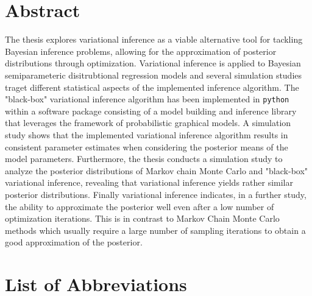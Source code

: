 \clearpage
{}


\section*{Abstract}

The thesis explores variational inference as a viable alternative tool for 
tackling Bayesian inference problems, allowing for the approximation of 
posterior distributions through optimization. Variational inference is applied 
to Bayesian semiparameteric
disitrubtional regression models and several simulation studies traget 
different statistical aspects of the implemented inference algorithm. 
The "black-box" variational inference algorithm has been implemented in \verb|python| 
within a software package consisting of a model building and inference library 
that leverages the framework of probabilistic graphical models.
A simulation study shows that the implemented variational inference algorithm results in 
consistent parameter estimates when considering the posterior means of the model parameters. 
Furthermore, the thesis conducts a simulation study to analyze the posterior distributions 
of Markov chain Monte Carlo and "black-box" variational inference, 
revealing that variational inference yields rather similar posterior distributions.
Finally variational inference indicates, in a further study, the ability to 
approximate the posterior well even after a low number of optimization iterations. 
This is in contrast to Markov Chain Monte Carlo methods which usually require a 
large number of sampling iterations to obtain a good approximation of the posterior.

\clearpage

\tableofcontents
\clearpage

\listoffigures

\listofalgorithms 

\listoftables

\section*{List of Abbreviations}


